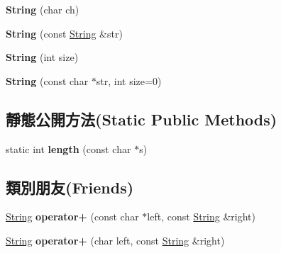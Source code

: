 \begin{DoxyCompactItemize}
\item 
{\bfseries String} (char ch)\hypertarget{class_i_dream_sky_1_1_string_a62a77180f8df2547e8be1313654abcee}{}\label{class_i_dream_sky_1_1_string_a62a77180f8df2547e8be1313654abcee}

\item 
{\bfseries String} (const \hyperlink{class_i_dream_sky_1_1_string}{String} \&str)\hypertarget{class_i_dream_sky_1_1_string_a5774bcd4a4c232a8aec5a3ec6d01a157}{}\label{class_i_dream_sky_1_1_string_a5774bcd4a4c232a8aec5a3ec6d01a157}

\item 
{\bfseries String} (int size)\hypertarget{class_i_dream_sky_1_1_string_a8cc4dd2dabcd4c53d3c75ce1dba9c600}{}\label{class_i_dream_sky_1_1_string_a8cc4dd2dabcd4c53d3c75ce1dba9c600}

\item 
{\bfseries String} (const char $\ast$str, int size=0)\hypertarget{class_i_dream_sky_1_1_string_af0850e7bc24f82b3227360b14cf66881}{}\label{class_i_dream_sky_1_1_string_af0850e7bc24f82b3227360b14cf66881}

\end{DoxyCompactItemize}
\subsection*{靜態公開方法(Static Public Methods)}
\begin{DoxyCompactItemize}
\item 
static int {\bfseries length} (const char $\ast$s)\hypertarget{class_i_dream_sky_1_1_string_a2b61a3d36b40be3414c0028ffb52bc0b}{}\label{class_i_dream_sky_1_1_string_a2b61a3d36b40be3414c0028ffb52bc0b}

\end{DoxyCompactItemize}
\subsection*{類別朋友(Friends)}
\begin{DoxyCompactItemize}
\item 
\hyperlink{class_i_dream_sky_1_1_string}{String} {\bfseries operator+} (const char $\ast$left, const \hyperlink{class_i_dream_sky_1_1_string}{String} \&right)\hypertarget{class_i_dream_sky_1_1_string_a1781d316e3efc3a1f7501d377498c74b}{}\label{class_i_dream_sky_1_1_string_a1781d316e3efc3a1f7501d377498c74b}

\item 
\hyperlink{class_i_dream_sky_1_1_string}{String} {\bfseries operator+} (char left, const \hyperlink{class_i_dream_sky_1_1_string}{String} \&right)\hypertarget{class_i_dream_sky_1_1_string_a024271b21b78cd1e9f7b8005955567f2}{}\label{class_i_dream_sky_1_1_string_a024271b21b78cd1e9f7b8005955567f2}

\end{DoxyCompactItemize}


